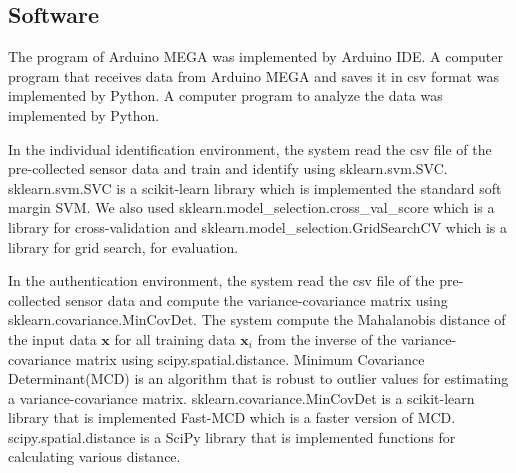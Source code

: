 \documentclass[sigchi,authordraft]{acmart}
\begin{document}
\subsection{Software}
The program of Arduino MEGA was implemented by Arduino IDE. A computer program that receives data from Arduino MEGA and saves it in csv format was implemented by Python. A computer program to analyze the data was implemented by Python.\par


In the individual identification environment, the system read the csv file of the pre-collected sensor data and train and identify using sklearn.svm.SVC. sklearn.svm.SVC is a scikit-learn\cite{scikit-learn} library which is implemented the standard soft margin SVM. We also used sklearn.model\_selection.cross\_val\_score which is a library for cross-validation and sklearn.model\_selection.GridSearchCV which is a library for grid search, for evaluation.\par


In the authentication environment, the system read the csv file of the pre-collected sensor data and compute the variance-covariance matrix using sklearn.covariance.MinCovDet. The system compute the Mahalanobis distance of the input data $\bm{x}$ for all training data $\bm{x}_i$ from the inverse of the variance-covariance matrix using scipy.spatial.distance. Minimum Covariance Determinant(MCD) is an algorithm that is robust to outlier values for estimating a variance-covariance matrix. sklearn.covariance.MinCovDet is a scikit-learn library that is implemented Fast-MCD\cite{fast_mcd} which is a faster version of MCD. scipy.spatial.distance is a SciPy\cite{scipy} library that is implemented functions for calculating various distance.
\end{document}
